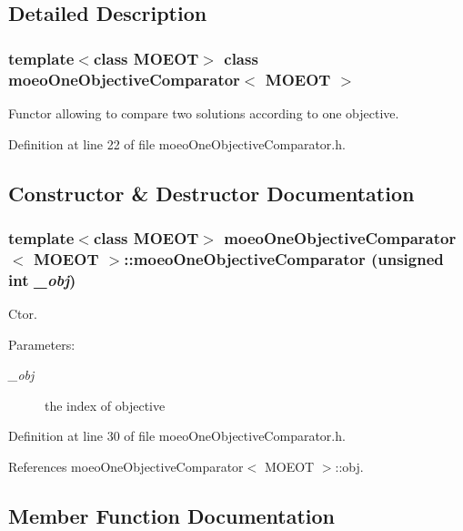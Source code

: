 \subsection{Detailed Description}
\subsubsection*{template$<$class MOEOT$>$ class moeo\-One\-Objective\-Comparator$<$ MOEOT $>$}

Functor allowing to compare two solutions according to one objective. 



Definition at line 22 of file moeo\-One\-Objective\-Comparator.h.

\subsection{Constructor \& Destructor Documentation}
\subsubsection{\setlength{\rightskip}{0pt plus 5cm}template$<$class MOEOT$>$ \bf{moeo\-One\-Objective\-Comparator}$<$ MOEOT $>$::\bf{moeo\-One\-Objective\-Comparator} (unsigned int {\em \_\-obj})\hspace{0.3cm}{\tt  [inline]}}\label{classmoeoOneObjectiveComparator_be1249440803553ef868182019d49e4d}


Ctor. 

\begin{Desc}
\item[Parameters:]
\begin{description}
\item[{\em \_\-obj}]the index of objective \end{description}
\end{Desc}


Definition at line 30 of file moeo\-One\-Objective\-Comparator.h.

References moeo\-One\-Objective\-Comparator$<$ MOEOT $>$::obj.

\subsection{Member Function Documentation}
